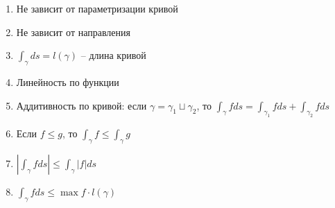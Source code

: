 \begin{theorem}
    \begin{enumerate}
        \item Не зависит от параметризации кривой
        \item Не зависит от направления
        \item $\int_{\gamma}^{}ds = l(\gamma)$ -- длина кривой 
        \item Линейность по функции
        \item Аддитивность по кривой: если $\gamma = \gamma_1 \sqcup \gamma_2$, то $\int_{\gamma}^{}f ds = \int_{\gamma_1}^{}f ds + \int_{\gamma_2}^{}f ds$
        \item Если $f \leq g$, то $\int_{\gamma}^{}f \leq \int_{\gamma}^{}g$
        \item $|\int_{\gamma}^{}f ds| \leq \int_{\gamma}^{}|f|ds$
        \item $\int_{\gamma}^{}fds \leq \max f \cdot l(\gamma)$
    \end{enumerate}
\end{theorem}

